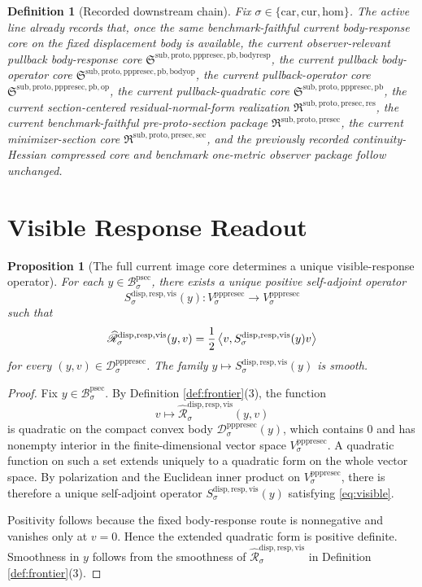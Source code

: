 \documentclass[11pt]{article}
\newcommand{\Car}{\mathrm{car}}
\newcommand{\Cur}{\mathrm{cur}}
\newcommand{\Hom}{\mathrm{hom}}
\newcommand{\ProtoSectionBody}[1]{\mathcal B_{#1}^{\mathrm{psec}}}
\newcommand{\PrePreProtoSectionPullbackCore}{\mathfrak S^{\mathrm{sub,proto,pppresec,pb}}}
\newcommand{\PrePreProtoSectionVertical}[1]{V_{#1}^{\mathrm{pppresec}}}
\newcommand{\PrePreProtoSectionResidualBody}[1]{\mathcal D_{#1}^{\mathrm{pppresec}}}
\newcommand{\PullbackOperatorCore}{\mathfrak S^{\mathrm{sub,proto,pppresec,pb,op}}}
\newcommand{\PullbackBodyOperatorCore}{\mathfrak S^{\mathrm{sub,proto,pppresec,pb,bodyop}}}
\newcommand{\PullbackBodyResponseCore}{\mathfrak S^{\mathrm{sub,proto,pppresec,pb,bodyresp}}}
\newcommand{\PreProtoSectionResidualPackage}{\mathfrak R^{\mathrm{sub,proto,presec,res}}}
\newcommand{\PreProtoSectionPackage}{\mathfrak R^{\mathrm{sub,proto,presec}}}
\newcommand{\PreProtoSectionMinSectionCore}{\mathfrak R^{\mathrm{sub,proto,presec,sec}}}
\newcommand{\CoreForcedBodyResponse}[1]{\widehat{\mathscr R}_{#1}^{\mathrm{disp,resp,vis}}}
\newcommand{\VisibleResponseOperator}[1]{S_{#1}^{\mathrm{disp,resp,vis}}}
\newtheorem{definition}{Definition}
\newtheorem{proposition}{Proposition}
\begin{document}
\begin{definition}[Recorded downstream chain]
\label{def:downstream}
Fix \(\sigma\in\{\Car,\Cur,\Hom\}\). The active line already records that, once the same benchmark-faithful current body-response core on the fixed displacement body is available, the current observer-relevant pullback body-response core \(\PullbackBodyResponseCore\), the current pullback body-operator core \(\PullbackBodyOperatorCore\), the current pullback-operator core \(\PullbackOperatorCore\), the current pullback-quadratic core \(\PrePreProtoSectionPullbackCore\), the current section-centered residual-normal-form realization \(\PreProtoSectionResidualPackage\), the current benchmark-faithful pre-proto-section package \(\PreProtoSectionPackage\), the current minimizer-section core \(\PreProtoSectionMinSectionCore\), and the previously recorded continuity-Hessian compressed core and benchmark one-metric observer package follow unchanged.
\end{definition}

\section{Visible Response Readout}

\begin{proposition}[The full current image core determines a unique visible-response operator]
\label{prop:visible}
For each \(y\in\ProtoSectionBody{\sigma}\), there exists a unique positive self-adjoint operator
\[
\VisibleResponseOperator{\sigma}(y):
\PrePreProtoSectionVertical{\sigma}\to\PrePreProtoSectionVertical{\sigma}
\]
such that
\begin{equation}
\CoreForcedBodyResponse{\sigma}(y,v)
=
\frac{1}{2}
\ev{v,\VisibleResponseOperator{\sigma}(y)v}
\label{eq:visible}
\end{equation}
for every \((y,v)\in\PrePreProtoSectionResidualBody{\sigma}\). The family \(y\mapsto\VisibleResponseOperator{\sigma}(y)\) is smooth.
\end{proposition}

\begin{proof}
Fix \(y\in\ProtoSectionBody{\sigma}\). By Definition \ref{def:frontier}(3), the function
\[
v\mapsto \CoreForcedBodyResponse{\sigma}(y,v)
\]
is quadratic on the compact convex body \(\PrePreProtoSectionResidualBody{\sigma}(y)\), which contains \(0\) and has nonempty interior in the finite-dimensional vector space \(\PrePreProtoSectionVertical{\sigma}\). A quadratic function on such a set extends uniquely to a quadratic form on the whole vector space. By polarization and the Euclidean inner product on \(\PrePreProtoSectionVertical{\sigma}\), there is therefore a unique self-adjoint operator \(\VisibleResponseOperator{\sigma}(y)\) satisfying \eqref{eq:visible}.

Positivity follows because the fixed body-response route is nonnegative and vanishes only at \(v=0\). Hence the extended quadratic form is positive definite. Smoothness in \(y\) follows from the smoothness of \(\CoreForcedBodyResponse{\sigma}\) in Definition \ref{def:frontier}(3).
\end{proof}
\end{document}
